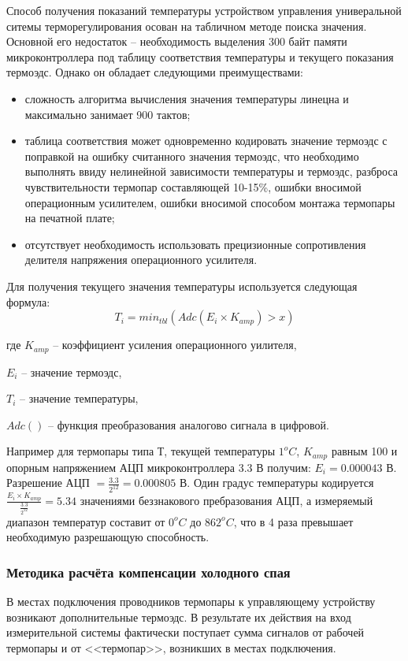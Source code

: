Способ получения показаний температуры устройством управления универальной
ситемы терморегулирования осован на табличном методе поиска значения.
Основной его недостаток -- необходимость выделения 300 байт памяти микроконтроллера под
таблицу соответствия температуры и текущего показания термоэдс.
Однако он обладает следующими преимуществами:
\begin{itemize}
	\item{} сложность алгоритма вычисления значения температуры линецна и максимально занимает
		900 тактов;
	\item{} таблица соответствия может одновременно кодировать значение термоэдс с поправкой на
		ошибку считанного значения термоэдс, что необходимо выполнять ввиду нелинейной зависимости
		температуры и термоэдс, разброса чувствительности термопар составляющей 10-15\%, ошибки
		вносимой операционным усилителем, ошибки вносимой способом монтажа термопары на печатной плате;
	\item{} отсутствует необходимость использовать прецизионные сопротивления делителя
		напряжения операционного усилителя.
\end{itemize}

Для получения текущего значения температуры используется следующая формула:
\begin{equation}
	T_i = min_{tbl}(Adc(E_i \times{} K_{amp}) > x) 
\end{equation}
\begin{ESKDexplanation}
	\item[где ]{} $K_{amp}$ -- коэффициент усиления операционного уилителя,
	\item{} $E_i$ -- значение термоэдс,
	\item{} $T_i$ -- значение температуры,
	\item{} $Adc()$ -- функция преобразования аналогово сигнала в цифровой.
\end{ESKDexplanation}


Например для термопары типа Т, текущей температуры $1^oC$, $K_{amp}$ равным 100 и опорным напряжением
АЦП микроконтроллера 3.3 В получим:
$E_i = 0.000043$ В. Разрешение АЦП $= \frac{3.3}{2^{12}} = 0.000805$ В. Один градус температуры
кодируется $\frac{E_i \times{} K_{amp}}{\frac{3.3}{2^{12}}} = 5.34 $ значениями
беззнакового пребразования АЦП, а измеряемый диапазон температур составит от $0^oC$ до $862^oC$,
что в 4 раза превышает необходимую разрешающую способность.

\subsubsection{Методика расчёта компенсации холодного спая}
В местах подключения проводников термопары к управляющему устройству возникают дополнительные термоэдс.
В результате их действия на вход измерительной системы фактически поступает сумма сигналов от рабочей
термопары и от <<термопар>>, возникших в местах подключения.

